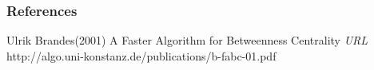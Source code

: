 \documentclass{beamer}
\begin{document}
\begin{frame}
\frametitle{References}
\footnotesize{
\begin{thebibliography}{99} %

 Ulrik Brandes(2001)
\newblock A Faster Algorithm for Betweenness Centrality
\newblock \emph{URL} http://algo.uni-konstanz.de/publications/b-fabc-01.pdf
\end{thebibliography}
}
\end{frame}

\end{document}
